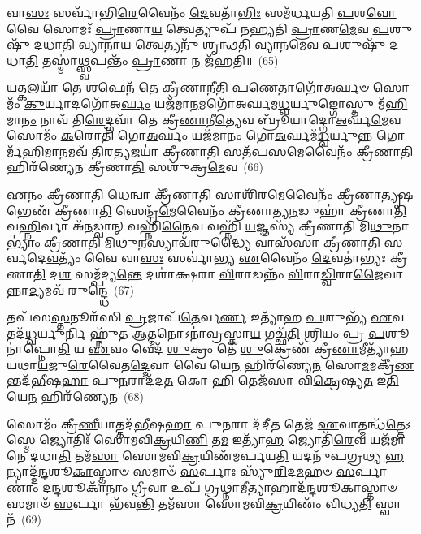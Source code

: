 𑌵𑌾\-\ul{𑌸𑌃} 𑌸𑌰𑍍𑌵𑌾᳴𑌭𑌿\-\ul{𑌰𑍇}\-𑌵𑍈𑌨𑌂᳴ \ul{𑌦𑍇}\-𑌵𑌤𑌾᳴\-\ul{𑌭𑌿𑌃} 𑌸𑌮᳴𑌰𑍍𑌧𑌯𑌤𑌿 \ul{𑌪}\-𑌶\-\ul{𑌵𑍋} 𑌵𑍈 𑌸𑍋𑌮𑌃᳴ \ul{𑌪𑍍𑌰𑌾}\-𑌣𑌾\-\ul{𑌯} 𑌤𑍍𑌵𑍇𑌤𑍍𑌯𑍁𑌪᳴ 𑌨𑌹𑍍𑌯𑌤𑌿 \ul{𑌪𑍍𑌰𑌾}\-𑌣\-\ul{𑌮𑍇}\-𑌵 \ul{𑌪}\-𑌶𑍁𑌷𑍁᳴ 𑌦𑌧𑌾𑌤𑌿 \ul{𑌵𑍍𑌯𑌾}\-𑌨𑌾\-\ul{𑌯} 𑌤𑍍𑌵𑍇𑌤𑍍𑌯𑌨𑍁᳴ 𑌶𑍃𑌨𑍍𑌥𑌤𑌿 \ul{𑌵𑍍𑌯𑌾}\-𑌨\-\ul{𑌮𑍇}\-𑌵 \ul{𑌪}\-𑌶𑍁𑌷𑍁᳴ 𑌦𑌧𑌾\-\ul{𑌤𑌿} 𑌤𑌸𑍍𑌮𑌾॑\-\ul{𑌥𑍍𑌸𑍍𑌵}\-𑌪𑌨𑍍𑌤𑌂᳴ \ul{𑌪𑍍𑌰𑌾}\-𑌣𑌾 𑌨 𑌜᳴𑌹𑌤𑌿॥~(65)

{\anuvakamend[{𑌇𑌤᳴𑌰𑌮𑍍𑌪\-\ul{𑌶𑍁}\-𑌮𑌾𑌨𑍍𑌥𑍍𑌸𑍍𑌯𑌾॑\-\ul{𑌦𑍍𑌯𑌾}\-𑌤𑍍𑌯𑌨᳴\-\ul{𑌸𑍋}\-𑌥𑍍𑌸𑌰𑍍𑌗᳴\-\ul{𑌨𑍍𑌤𑍂}\-𑌷𑍍𑌣𑍀𑍞 𑌸᳴𑌰𑍍𑌵𑌦𑍇\-\ul{𑌵}\-𑌤𑍍𑌯𑌂᳴ 𑌵𑍈 𑌤𑍍𑌰𑌯᳴𑌸𑍍𑌤𑍍𑌰𑌿𑍞𑌶𑌚𑍍𑌚}]}%

𑌯\-\ul{𑌤𑍍𑌕}\-𑌲𑌯𑌾᳴ 𑌤𑍇 \ul{𑌶}\-𑌫𑍇𑌨᳴ 𑌤𑍇 𑌕𑍍𑌰𑍀\-\ul{𑌣𑌾}\-𑌨𑍀\-\ul{𑌤𑌿} 𑌪\-\ul{𑌣𑍇}\-𑌤𑌾𑌗𑍋᳴𑌅\-\ul{𑌰𑍍𑌘}\-\-\ul{𑍞} 𑌸𑍋𑌮𑌂᳴ \ul{𑌕𑍁}\-𑌰𑍍𑌯𑌾𑌦𑌗𑍋᳴𑌅\-\ul{𑌰𑍍𑌘𑌂} 𑌯𑌜᳴𑌮𑌾\-\ul{𑌨}\-𑌮𑌗𑍋᳴𑌅𑌰𑍍𑌘𑌮\-\ul{𑌧𑍍𑌵}\-𑌰𑍍𑌯𑍁𑌙𑍍𑌗𑍋𑌸𑍍𑌤𑍁 𑌮᳴\-\ul{𑌹𑌿}\-𑌮𑌾\-\ul{𑌨𑌂} 𑌨𑌾𑌵᳴ 𑌤𑌿\-\ul{𑌰𑍇}\-𑌦𑍍𑌗𑌵𑌾᳴ 𑌤𑍇 𑌕𑍍𑌰𑍀\-\ul{𑌣𑌾}\-𑌨𑍀\-\ul{𑌤𑍍𑌯𑍇}\-𑌵 𑌬𑍍𑌰𑍂᳴𑌯𑌾𑌦𑍍𑌗𑍋\-\ul{𑌅}\-𑌰𑍍𑌘\-\ul{𑌮𑍇}\-𑌵 𑌸𑍋𑌮𑌂᳴ \ul{𑌕}\-𑌰𑍋𑌤𑌿᳴ 𑌗𑍋\-\ul{𑌅}\-𑌰𑍍𑌘𑌂 𑌯𑌜᳴𑌮𑌾𑌨𑌂 𑌗𑍋\-\ul{𑌅}\-𑌰𑍍𑌘𑌮᳴\-\ul{𑌧𑍍𑌵}\-𑌰𑍍𑌯𑍁𑌨𑍍𑌨 𑌗𑍋𑌰𑍍𑌮᳴\-\ul{𑌹𑌿}\-𑌮𑌾\-\ul{𑌨}\-𑌮𑌵᳴ 𑌤𑌿𑌰\-\ul{𑌤𑍍𑌯}\-𑌜𑌯𑌾॑ 𑌕𑍍𑌰𑍀𑌣𑌾\-\ul{𑌤𑌿} 𑌸𑌤᳴𑌪𑌸\-\ul{𑌮𑍇}\-𑌵𑍈𑌨𑌂᳴ 𑌕𑍍𑌰𑍀𑌣𑌾\-\ul{𑌤𑌿} 𑌹𑌿𑌰᳴𑌣𑍍𑌯𑍇𑌨 𑌕𑍍𑌰𑍀𑌣𑌾\-\ul{𑌤𑌿} 𑌸𑌶𑍁᳴𑌕𑍍𑌰\-\ul{𑌮𑍇}\-𑌵~(66)

\-\ul{𑌏}\-\-\ul{𑌨𑌂} \ul{𑌕𑍍𑌰𑍀}\-\-\ul{𑌣𑌾}\-\-\ul{𑌤𑌿} \ul{𑌧𑍇}\-𑌨𑍍𑌵𑌾 𑌕𑍍𑌰𑍀᳴𑌣𑌾\-\ul{𑌤𑌿} 𑌸𑌾𑌶𑌿᳴𑌰\-\ul{𑌮𑍇}\-𑌵𑍈𑌨𑌂᳴ 𑌕𑍍𑌰𑍀𑌣𑌾𑌤𑍍𑌯𑍃\-\ul{𑌷}\-𑌭𑍇𑌣᳴ 𑌕𑍍𑌰𑍀𑌣𑌾\-\ul{𑌤𑌿} 𑌸𑍇𑌨𑍍𑌦𑍍𑌰᳴\-\ul{𑌮𑍇}\-𑌵𑍈𑌨𑌂᳴ 𑌕𑍍𑌰𑍀𑌣𑌾𑌤𑍍𑌯\-\ul{𑌨}\-𑌡𑍁𑌹𑌾॑ 𑌕𑍍𑌰𑍀𑌣𑌾\-\ul{𑌤𑌿} 𑌵\-\ul{𑌹𑍍𑌨𑌿}\-𑌰𑍍𑌵𑌾 𑌅᳴\-\ul{𑌨}\-𑌡𑍍𑌵𑌾𑌨𑍍 𑌵𑌹𑍍𑌨𑌿᳴\-\ul{𑌨𑍈}\-𑌵 𑌵𑌹𑍍𑌨𑌿᳴ \ul{𑌯}\-𑌜𑍍𑌞𑌸𑍍𑌯᳴ 𑌕𑍍𑌰𑍀𑌣𑌾𑌤𑌿 𑌮𑌿\-\ul{𑌥𑍁}\-𑌨𑌾\-𑌭𑍍𑌯𑌾𑌂॑ 𑌕𑍍𑌰𑍀𑌣𑌾𑌤𑌿 𑌮𑌿\-\ul{𑌥𑍁}\-𑌨𑌸𑍍𑌯𑌾𑌵᳴𑌰𑍁\-\ul{𑌦𑍍𑌧𑍍𑌯𑍈} 𑌵𑌾𑌸᳴𑌸𑌾 𑌕𑍍𑌰𑍀𑌣𑌾𑌤𑌿 𑌸𑌰𑍍𑌵𑌦𑍇\-\ul{𑌵}\-𑌤𑍍𑌯𑌂᳴ 𑌵𑍈 𑌵𑌾\-\ul{𑌸𑌃} 𑌸𑌰𑍍𑌵𑌾॑𑌭𑍍𑌯 \ul{𑌏}\-𑌵𑍈𑌨𑌂᳴ \ul{𑌦𑍇}\-𑌵𑌤𑌾॑𑌭𑍍𑌯𑌃 𑌕𑍍𑌰𑍀𑌣𑌾\-\ul{𑌤𑌿} 𑌦\-\ul{𑌶} 𑌸𑌮𑍍𑌪᳴𑌦𑍍𑌯\-\ul{𑌨𑍍𑌤𑍇} 𑌦𑌶𑌾॑𑌕𑍍𑌷𑌰𑌾 \ul{𑌵𑌿}\-𑌰𑌾𑌡𑌨𑍍𑌨𑌂᳴ \ul{𑌵𑌿}\-𑌰𑌾\-\ul{𑌡𑍍𑌵𑌿}\-𑌰𑌾\-\ul{𑌜𑍈}\-𑌵𑌾𑌨𑍍𑌨𑌾\-\ul{𑌦𑍍𑌯}\-𑌮𑌵᳴ 𑌰𑍁𑌨𑍍𑌦𑍍𑌧𑍇~(67)

𑌤𑌪᳴𑌸\-\ul{𑌸𑍍𑌤}\-𑌨𑍂𑌰᳴𑌸𑌿 \ul{𑌪𑍍𑌰}\-𑌜𑌾𑌪᳴\-\ul{𑌤𑍇}\-𑌰𑍍𑌵\-\ul{𑌰𑍍𑌣} 𑌇𑌤𑍍𑌯𑌾᳴𑌹 \ul{𑌪}\-𑌶𑍁𑌭𑍍𑌯᳴ \ul{𑌏}\-𑌵 𑌤𑌦᳴\-\ul{𑌧𑍍𑌵}\-𑌰𑍍𑌯𑍁𑌰𑍍𑌨𑌿 𑌹𑍍𑌨𑍁᳴𑌤 \ul{𑌆}\-𑌤𑍍𑌮𑌨𑍋\-𑌽𑌨𑌾॑𑌵𑍍𑌰𑌸𑍍𑌕𑌾\-\ul{𑌯} 𑌗𑌚𑍍𑌛᳴\-\ul{𑌤𑌿} 𑌶𑍍𑌰𑌿𑌯𑌂 𑌪𑍍𑌰 \ul{𑌪}\-𑌶𑍂𑌨𑌾॑𑌪𑍍𑌨𑍋\-\ul{𑌤𑌿} 𑌯 \ul{𑌏}\-𑌵𑌂 𑌵𑍇𑌦᳴ \ul{𑌶𑍁}\-𑌕𑍍𑌰𑌂 𑌤𑍇᳴ \ul{𑌶𑍁}\-𑌕𑍍𑌰𑍇𑌣᳴ 𑌕𑍍𑌰𑍀\-\ul{𑌣𑌾}\-𑌮𑍀𑌤𑍍𑌯𑌾᳴𑌹 𑌯𑌥𑌾\-\ul{𑌯}\-𑌜𑍁\-\ul{𑌰𑍇}\-𑌵𑍈𑌤\-\ul{𑌦𑍍𑌦𑍇}\-𑌵𑌾 𑌵𑍈 𑌯𑍇\-\ul{𑌨} 𑌹𑌿𑌰᳴𑌣𑍍𑌯𑍇\-\ul{𑌨} 𑌸𑍋\-\ul{𑌮}\-𑌮𑌕𑍍𑌰𑍀᳴\-\ul{𑌣}\-𑌨𑍍𑌤𑌦᳴\-\ul{𑌭𑍀}\-𑌷\-\ul{𑌹𑌾} 𑌪𑍁\-\ul{𑌨}\-𑌰𑌾𑌦᳴𑌦\-\ul{𑌤} 𑌕𑍋 𑌹𑌿 𑌤𑍇𑌜᳴𑌸𑌾 𑌵𑌿\-\ul{𑌕𑍍𑌰𑍇}\-𑌷𑍍𑌯\-\ul{𑌤} 𑌇\-\ul{𑌤𑌿} 𑌯𑍇\-\ul{𑌨} 𑌹𑌿𑌰᳴𑌣𑍍𑌯𑍇𑌨~(68)

𑌸𑍋𑌮𑌂᳴ 𑌕𑍍𑌰𑍀\-\ul{𑌣𑍀}\-𑌯𑌾𑌤𑍍𑌤𑌦᳴\-\ul{𑌭𑍀}\-𑌷\-\ul{𑌹𑌾} 𑌪𑍁\-\ul{𑌨}\-𑌰𑌾 𑌦᳴𑌦𑍀\-\ul{𑌤} 𑌤𑍇𑌜᳴ \ul{𑌏}\-𑌵𑌾𑌤𑍍𑌮𑌨𑍍𑌧᳴\-\ul{𑌤𑍍𑌤𑍇}\-\-𑌽𑌸𑍍𑌮𑍇 𑌜𑍍𑌯𑍋𑌤𑌿𑌃᳴ 𑌸𑍋𑌮𑌵𑌿\-\ul{𑌕𑍍𑌰}\-𑌯𑌿\-\ul{𑌣𑌿} 𑌤\-\ul{𑌮} 𑌇𑌤𑍍𑌯𑌾᳴\-\ul{𑌹} 𑌜𑍍𑌯𑍋𑌤𑌿᳴\-\ul{𑌰𑍇}\-𑌵 𑌯𑌜᳴𑌮𑌾𑌨𑍇 𑌦𑌧𑌾\-\ul{𑌤𑌿} 𑌤𑌮᳴\-\ul{𑌸𑌾} 𑌸𑍋𑌮𑌵𑌿\-\ul{𑌕𑍍𑌰}\-𑌯𑌿𑌣᳴𑌮𑌰𑍍𑌪𑌯\-\ul{𑌤𑌿} 𑌯𑌦𑌨𑍁᳴𑌪𑌗𑍍𑌰𑌥𑍍𑌯 \ul{𑌹}\-𑌨𑍍𑌯𑌾𑌦𑍍𑌦᳴\-\ul{𑌨𑍍𑌦}\-𑌶𑍂\-\ul{𑌕𑌾}\-𑌸𑍍𑌤𑌾𑍞 𑌸𑌮𑌾𑍞᳴ \ul{𑌸}\-𑌰𑍍𑌪𑌾𑌃 𑌸𑍍𑌯𑍁᳴\-\ul{𑌰𑌿}\-𑌦\-\ul{𑌮}\-𑌹𑍞 \ul{𑌸}\-𑌰𑍍𑌪𑌾𑌣𑌾𑌂॑ 𑌦\-\ul{𑌨𑍍𑌦}\-𑌶𑍂𑌕𑌾᳴𑌨𑌾𑌂 \ul{𑌗𑍍𑌰𑍀}\-𑌵𑌾 𑌉𑌪᳴ 𑌗𑍍𑌰\-\ul{𑌥𑍍𑌨𑌾}\-𑌮𑍀\-\ul{𑌤𑍍𑌯𑌾}\-𑌹𑌾𑌦᳴𑌨𑍍𑌦𑌶𑍂\-\ul{𑌕𑌾}\-𑌸𑍍𑌤𑌾𑍞 𑌸𑌮𑌾𑍞᳴ \ul{𑌸}\-𑌰𑍍𑌪𑌾 𑌭᳴𑌵\-\ul{𑌨𑍍𑌤𑌿} 𑌤𑌮᳴𑌸𑌾 𑌸𑍋𑌮𑌵𑌿\-\ul{𑌕𑍍𑌰}\-𑌯𑌿𑌣𑌂᳴ 𑌵𑌿𑌧𑍍𑌯\-\ul{𑌤𑌿} 𑌸𑍍𑌵𑌾𑌨᳴~(69)

